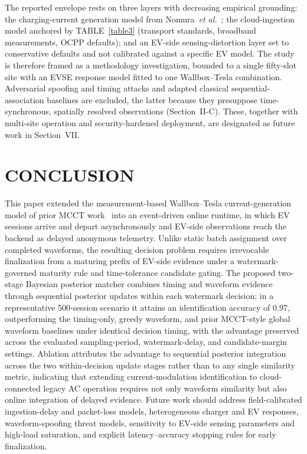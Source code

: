 \documentclass{ieeeaccess}
\begin{document}
     The reported envelope rests on three layers with decreasing empirical grounding: the charging-current generation model from Nomura~\textit{et al.}~\cite{b14}; the cloud-ingestion model anchored by TABLE~\ref{table3} (transport standards, broadband measurements, OCPP defaults); and an EV-side sensing-distortion layer set to conservative defaults and not calibrated against a specific EV model. The study is therefore framed as a methodology investigation, bounded to a single fifty-slot site with an EVSE response model fitted to one Wallbox--Tesla combination. Adversarial spoofing and timing attacks and adapted classical sequential-association baselines are excluded, the latter because they presuppose time-synchronous, spatially resolved observations (Section~II-C). These, together with multi-site operation and security-hardened deployment, are designated as future work in Section~VII.

    \section{CONCLUSION}
     This paper extended the measurement-based Wallbox--Tesla current-generation model of prior MCCT work~\cite{b14} into an event-driven online runtime, in which EV sessions arrive and depart asynchronously and EV-side observations reach the backend as delayed anonymous telemetry.
    Unlike static batch assignment over completed waveforms, the resulting decision problem requires irrevocable finalization from a maturing prefix of EV-side evidence under a watermark-governed maturity rule and time-tolerance candidate gating.
    The proposed two-stage Bayesian posterior matcher combines timing and waveform evidence through sequential posterior updates within each watermark decision; in a representative 500-session scenario it attains an identification accuracy of 0.97, outperforming the timing-only, greedy waveform, and prior MCCT-style global waveform baselines under identical decision timing, with the advantage preserved across the evaluated sampling-period, watermark-delay, and candidate-margin settings.
    Ablation attributes the advantage to sequential posterior integration across the two within-decision update stages rather than to any single similarity metric, indicating that extending current-modulation identification to cloud-connected legacy AC operation requires not only waveform similarity but also online integration of delayed evidence.
    Future work should address field-calibrated ingestion-delay and packet-loss models, heterogeneous charger and EV responses, waveform-spoofing threat models, sensitivity to EV-side sensing parameters and high-load saturation, and explicit latency--accuracy stopping rules for early finalization.
\end{document}
